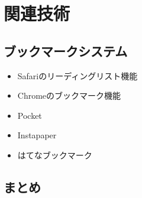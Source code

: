 \chapter{関連技術}
\label{chap:related_works}


\section{ブックマークシステム}

\begin{itemize}
  \item Safariのリーディングリスト機能
  \item Chromeのブックマーク機能
  \item Pocket
  \item Instapaper
  \item はてなブックマーク
\end{itemize}

\section{まとめ}

